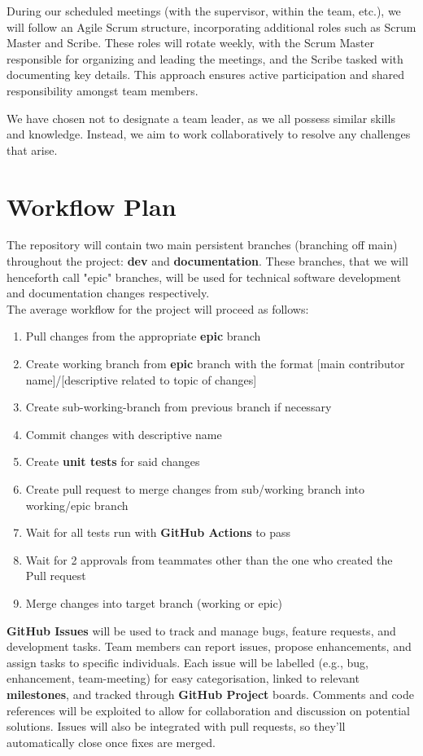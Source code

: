 \documentclass{article}
\begin{document}
During our scheduled meetings (with the supervisor, within the team, etc.), we will follow
an Agile Scrum structure, incorporating additional roles such as Scrum Master and Scribe.
These roles will rotate weekly, with the Scrum Master responsible for organizing and leading
the meetings, and the Scribe tasked with documenting key details. This approach ensures active
participation and shared responsibility amongst team members.

We have chosen not to designate a team leader, as we all possess similar skills and knowledge.
Instead, we aim to work collaboratively to resolve any challenges that arise.

\section{Workflow Plan}

The repository will contain two main persistent branches (branching off main) throughout the project:
\textbf{dev} and \textbf{documentation}. These branches, that we will henceforth call "epic" branches, will be used for technical
software development and documentation changes respectively. \\

The average workflow for the project will proceed as follows:
\begin{enumerate}
  \item Pull changes from the appropriate \textbf{epic} branch
  \item Create working branch from \textbf{epic} branch with the format [main contributor name]/[descriptive related to topic of changes]
  \item Create sub-working-branch from previous branch if necessary
  \item Commit changes with descriptive name
  \item Create \textbf{unit tests} for said changes
  \item Create pull request to merge changes from sub/working branch into working/epic branch
  \item Wait for all tests run with \textbf{GitHub Actions} to pass
  \item Wait for 2 approvals from teammates other than the one who created the Pull request
  \item Merge changes into target branch (working or epic)
\end{enumerate}

\noindent
\textbf{GitHub Issues} will be used to track and manage bugs, feature requests, and development tasks. Team members can report issues, propose enhancements, and assign tasks to specific individuals. Each issue will be labelled (e.g., bug, enhancement, team-meeting) for easy categorisation, linked to relevant \textbf{milestones}, and tracked through \textbf{GitHub Project} boards. Comments and code references will be exploited to allow for collaboration and discussion on potential solutions. Issues will also be integrated with pull requests, so they’ll automatically close once fixes are merged. \\
\end{document}
